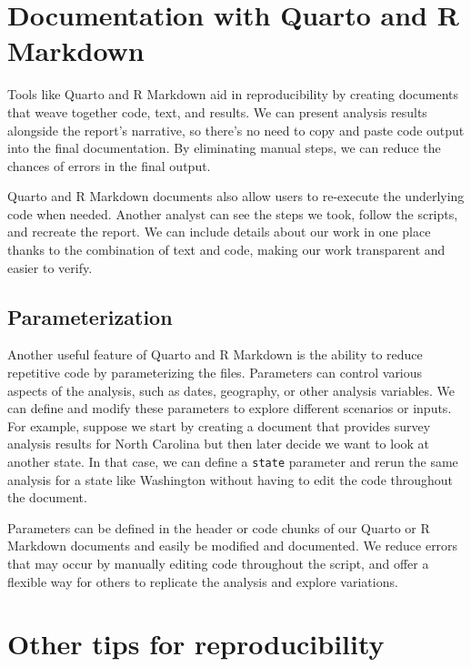 \documentclass[
]{krantz}
\begin{document}
\hypertarget{documentation-with-quarto-and-r-markdown}{%
\section{Documentation with Quarto and R Markdown}\label{documentation-with-quarto-and-r-markdown}}

Tools like Quarto and R Markdown aid in reproducibility by creating documents that weave together code, text, and results. We can present analysis results alongside the report's narrative, so there's no need to copy and paste code output into the final documentation. By eliminating manual steps, we can reduce the chances of errors in the final output.

Quarto and R Markdown documents also allow users to re-execute the underlying code when needed. Another analyst can see the steps we took, follow the scripts, and recreate the report. We can include details about our work in one place thanks to the combination of text and code, making our work transparent and easier to verify.

\hypertarget{parameterization}{%
\subsection{Parameterization}\label{parameterization}}

Another useful feature of Quarto and R Markdown is the ability to reduce repetitive code by parameterizing the files. Parameters can control various aspects of the analysis, such as dates, geography, or other analysis variables. We can define and modify these parameters to explore different scenarios or inputs. For example, suppose we start by creating a document that provides survey analysis results for North Carolina but then later decide we want to look at another state. In that case, we can define a \texttt{state} parameter and rerun the same analysis for a state like Washington without having to edit the code throughout the document.

Parameters can be defined in the header or code chunks of our Quarto or R Markdown documents and easily be modified and documented. We reduce errors that may occur by manually editing code throughout the script, and offer a flexible way for others to replicate the analysis and explore variations.

\hypertarget{other-tips-for-reproducibility}{%
\section{Other tips for reproducibility}\label{other-tips-for-reproducibility}}
\end{document}
